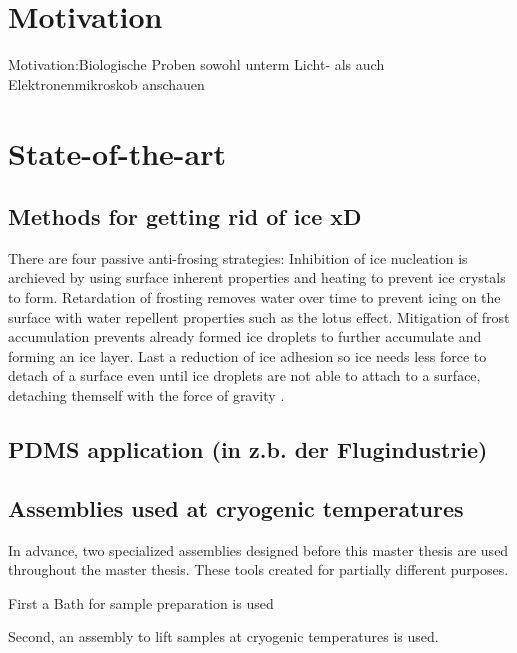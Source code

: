 
\section{Motivation}
Motivation:Biologische Proben sowohl unterm Licht- als auch Elektronenmikroskob anschauen

\section{State-of-the-art}

\subsection{Methods for getting rid of ice xD}

There are four passive anti-frosing strategies: Inhibition of ice nucleation is archieved by using surface inherent properties and heating to prevent ice crystals to form. Retardation of frosting removes water over time to prevent icing on the surface with water repellent properties such as the lotus effect. Mitigation of frost accumulation prevents already formed ice droplets to further accumulate and forming an ice layer. Last a reduction of ice adhesion so ice needs less force to detach of a surface even until ice droplets are not able to attach to a surface, detaching themself with the force of gravity \cite{Yang.2021}. 

\subsection{PDMS application (in z.b. der Flugindustrie)}

\subsection{Assemblies used at cryogenic temperatures}

In advance, two specialized assemblies designed before this master thesis are used throughout the master thesis. These tools created for partially different purposes.

First a Bath for sample preparation is used

Second, an assembly to lift samples at cryogenic temperatures is used.

